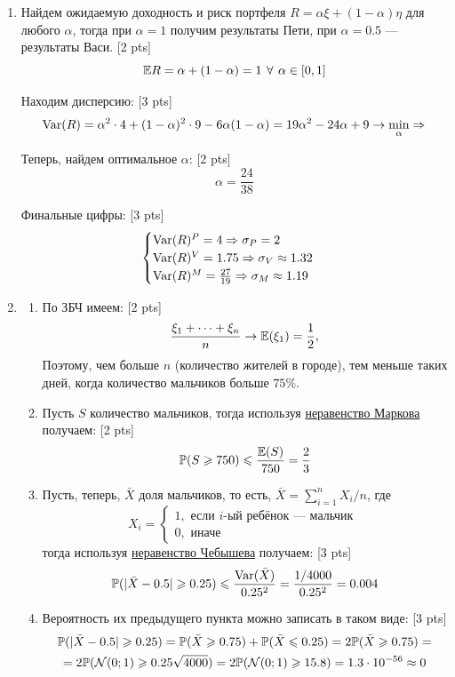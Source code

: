 \documentclass[12pt, a4paper]{article}\usepackage[]{graphicx}\usepackage[]{color}
\newcommand{\cN}{\mathcal{N}}
\begin{document}
\begin{enumerate}
\item Найдем ожидаемую доходность и риск портфеля $R = \alpha \xi + (1-\alpha) \eta$ для любого $\alpha$, тогда при $\alpha = 1$ получим результаты Пети, при $\alpha = 0.5$ — результаты Васи. [2 pts]
\[
\mathbb{E} R = \alpha + (1-\alpha) = 1 \: \, \forall \, \: \alpha \in [0,1]
\]

Находим дисперсию: [3 pts]
\[
\operatorname{Var}(R) = \alpha^2 \cdot 4 + (1-\alpha)^2 \cdot 9 - 6\alpha (1-\alpha) = 19\alpha^2 -24\alpha + 9 \to \min_{\alpha} \Rightarrow
\]


Теперь, найдем оптимальное $\alpha$: [2 pts]
\[
\alpha = \frac{24}{38}
\]

Финальные цифры: [3 pts]
\[
\begin{cases}
\operatorname{Var}(R)^{P} = 4 \Rightarrow \sigma_{P} = 2 \\
\operatorname{Var}(R)^{V} = 1.75 \Rightarrow \sigma_{V} \approx 1.32 \\
\operatorname{Var}(R)^{M} = \frac{27}{19} \Rightarrow \sigma_{M} \approx 1.19 \\
\end{cases}
\]




\item
\begin{enumerate}
\item По ЗБЧ имеем: [2 pts]
\[
\frac{\xi_1 + \dots + \xi_n}{n} \to \mathbb{E}(\xi_1) = \frac{1}{2},
\]
Поэтому, чем больше $n$ (количество жителей в городе), тем меньше таких дней, когда количество мальчиков больше $75\%.$ \\
\item Пусть $S$ количество мальчиков, тогда используя \href{https://en.wikipedia.org/wiki/Markov%27s_inequality}{неравенство Маркова} получаем: [2 pts]
\[
\mathbb{P}(S \geqslant 750) \leqslant \frac{\mathbb{E}(S)}{750} = \frac{2}{3}
\]
\item Пусть, теперь, $\bar X$ доля мальчиков, то есть, $\bar X = \sum_{i=1}^n X_i /n$, где
\[
X_i =
\begin{cases}
1, \text{ если }i\text{-ый ребёнок — мальчик }\\
0, \text{ иначе }
\end{cases}
\]
тогда используя \href{https://en.wikipedia.org/wiki/Markov%27s_inequality}{неравенство Чебышева} получаем: [3 pts]
\[
\mathbb{P}(|\bar X - 0.5| \geqslant 0.25) \leqslant \frac{\operatorname{Var}(\bar X)}{0.25^2} = \frac{1/4000}{0.25^2} = 0.004
\]
\item Вероятность их предыдущего пункта можно записать в таком виде: [3 pts]
\begin{multline}
\P(|\bar X - 0.5| \ge 0.25) = \P(\bar X \ge 0.75) + \P(\bar X \le 0.25) = 2\P(\bar X \ge 0.75)=\\
= 2\P(\cN(0;1)\geq 0.25\sqrt{4000})=2\P(\cN(0;1)\geq 15.8) = 1.3 \cdot 10^{-56} \approx 0
\nonumber\end{multline}
\end{enumerate}


\end{enumerate}
\end{document}
